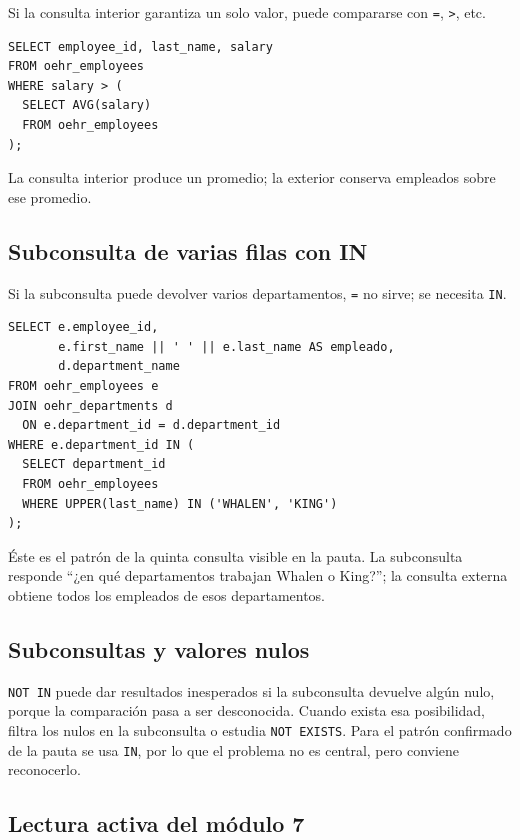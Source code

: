 \documentclass[11pt,a4paper]{article}
\newcommand{\campo}[1]{\texttt{#1}}
\begin{document}
Si la consulta interior garantiza un solo valor, puede compararse con \campo{=}, \campo{>}, etc.

\begin{lstlisting}
SELECT employee_id, last_name, salary
FROM oehr_employees
WHERE salary > (
  SELECT AVG(salary)
  FROM oehr_employees
);
\end{lstlisting}

La consulta interior produce un promedio; la exterior conserva empleados sobre ese promedio.

\subsection{Subconsulta de varias filas con IN}

Si la subconsulta puede devolver varios departamentos, \campo{=} no sirve; se necesita \campo{IN}.

\begin{lstlisting}
SELECT e.employee_id,
       e.first_name || ' ' || e.last_name AS empleado,
       d.department_name
FROM oehr_employees e
JOIN oehr_departments d
  ON e.department_id = d.department_id
WHERE e.department_id IN (
  SELECT department_id
  FROM oehr_employees
  WHERE UPPER(last_name) IN ('WHALEN', 'KING')
);
\end{lstlisting}

Éste es el patrón de la quinta consulta visible en la pauta. La subconsulta responde ``¿en qué
departamentos trabajan Whalen o King?''; la consulta externa obtiene todos los empleados de esos
departamentos.

\subsection{Subconsultas y valores nulos}

\campo{NOT IN} puede dar resultados inesperados si la subconsulta devuelve algún nulo, porque la
comparación pasa a ser desconocida. Cuando exista esa posibilidad, filtra los nulos en la subconsulta
o estudia \campo{NOT EXISTS}. Para el patrón confirmado de la pauta se usa \campo{IN}, por lo que el
problema no es central, pero conviene reconocerlo.

\subsection{Lectura activa del módulo 7}
\end{document}
